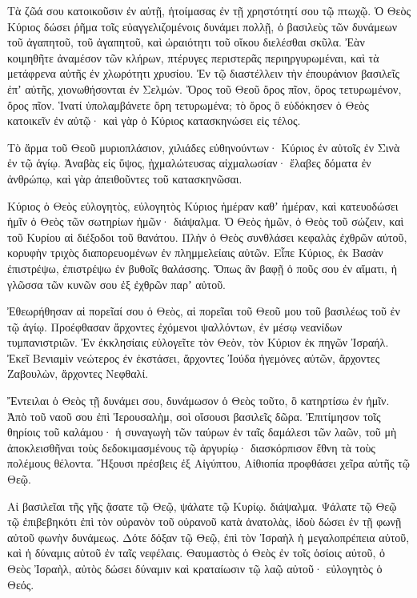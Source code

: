 \begin{spacing}{1.1}
\begin{multicols}{2}
Τὰ ζῶά σου κατοικοῦσιν ἐν αὐτῇ, ἡτοίμασας ἐν τῇ χρηστότητί σου τῷ πτωχῷ.
Ὁ Θεὸς Κύριος δώσει ῥῆμα τοῖς εὐαγγελιζομένοις δυνάμει πολλῇ,
ὁ βασιλεὺς τῶν δυνάμεων τοῦ ἀγαπητοῦ, τοῦ ἀγαπητοῦ, καὶ ὡραιότητι τοῦ οἴκου διελέσθαι σκῦλα.
Ἐὰν κοιμηθῆτε ἀναμέσον τῶν κλήρων, πτέρυγες περιστερᾶς περιηργυρωμέναι, καὶ τὰ μετάφρενα αὐτῆς ἐν χλωρότητι χρυσίου.
Ἐν τῷ διαστέλλειν τὴν ἐπουράνιον βασιλεῖς ἐπʼ αὐτῆς, χιονωθήσονται ἐν Σελμών.
Ὄρος τοῦ Θεοῦ ὄρος πῖον, ὄρος τετυρωμένον, ὄρος πῖον.
Ἱνατί ὑπολαμβάνετε ὄρη τετυρωμένα; τὸ ὄρος ὃ εὐδόκησεν ὁ Θεὸς κατοικεῖν ἐν αὐτῷ· καὶ γὰρ ὁ Κύριος κατασκηνώσει εἰς τέλος.

Τὸ ἅρμα τοῦ Θεοῦ μυριοπλάσιον, χιλιάδες εὐθηνούντων· Κύριος ἐν αὐτοῖς ἐν Σινὰ ἐν τῷ ἁγίῳ.
Ἀναβὰς εἰς ὕψος, ᾐχμαλώτευσας αἰχμαλωσίαν· ἔλαβες δόματα ἐν ἀνθρώπῳ, καὶ γὰρ ἀπειθοῦντες τοῦ κατασκηνῶσαι.

Κύριος ὁ Θεὸς εὐλογητὸς, εὐλογητὸς Κύριος ἡμέραν καθʼ ἡμέραν, καὶ κατευοδώσει ἡμῖν ὁ Θεὸς τῶν σωτηρίων ἡμῶν· διάψαλμα.
Ὁ Θεὸς ἡμῶν, ὁ Θεὸς τοῦ σώζειν, καὶ τοῦ Κυρίου αἱ διέξοδοι τοῦ θανάτου.
Πλὴν ὁ Θεὸς συνθλάσει κεφαλὰς ἐχθρῶν αὐτοῦ, κορυφὴν τριχὸς διαπορευομένων ἐν πλημμελείαις αὐτῶν.
Εἶπε Κύριος, ἐκ Βασὰν ἐπιστρέψω, ἐπιστρέψω ἐν βυθοῖς θαλάσσης.
Ὅπως ἂν βαφῇ ὁ ποῦς σου ἐν αἵματι, ἡ γλῶσσα τῶν κυνῶν σου ἐξ ἐχθρῶν παρʼ αὐτοῦ.

Ἐθεωρήθησαν αἱ πορεῖαί σου ὁ Θεὸς, αἱ πορεῖαι τοῦ Θεοῦ μου τοῦ βασιλέως τοῦ ἐν τῷ ἁγίῳ.
Προέφθασαν ἄρχοντες ἐχόμενοι ψαλλόντων, ἐν μέσῳ νεανίδων τυμπανιστριῶν.
Ἐν ἐκκλησίαις εὐλογεῖτε τὸν Θεὸν, τὸν Κύριον ἐκ πηγῶν Ἰσραήλ.
Ἐκεῖ Βενιαμὶν νεώτερος ἐν ἐκστάσει, ἄρχοντες Ἰούδα ἡγεμόνες αὐτῶν, ἄρχοντες Ζαβουλὼν, ἄρχοντες Νεφθαλί.

Ἔντειλαι ὁ Θεὸς τῇ δυνάμει σου, δυνάμωσον ὁ Θεὸς τοῦτο, ὃ κατηρτίσω ἐν ἡμῖν.
Ἀπὸ τοῦ ναοῦ σου ἐπὶ Ἱερουσαλὴμ, σοὶ οἴσουσι βασιλεῖς δῶρα.
Ἐπιτίμησον τοῖς θηρίοις τοῦ καλάμου· ἡ συναγωγὴ τῶν ταύρων ἐν ταῖς δαμάλεσι τῶν λαῶν, τοῦ μὴ ἀποκλεισθῆναι τοὺς δεδοκιμασμένους τῷ ἀργυρίῳ· διασκόρπισον ἔθνη τὰ τοὺς πολέμους θέλοντα.
Ἥξουσι πρέσβεις ἐξ Αἰγύπτου, Αἰθιοπία προφθάσει χεῖρα αὐτῆς τῷ Θεῷ.

Αἱ βασιλεῖαι τῆς γῆς ᾄσατε τῷ Θεῷ, ψάλατε τῷ Κυρίῳ. διάψαλμα.
Ψάλατε τῷ Θεῷ τῷ ἐπιβεβηκότι ἐπὶ τὸν οὐρανὸν τοῦ οὐρανοῦ κατὰ ἀνατολὰς, ἰδοὺ δώσει ἐν τῇ φωνῇ αὐτοῦ φωνὴν δυνάμεως.
Δότε δόξαν τῷ Θεῷ, ἐπὶ τὸν Ἰσραὴλ ἡ μεγαλοπρέπεια αὐτοῦ, καὶ ἡ δύναμις αὐτοῦ ἐν ταῖς νεφέλαις.
Θαυμαστὸς ὁ Θεὸς ἐν τοῖς ὁσίοις αὐτοῦ, ὁ Θεὸς Ἰσραὴλ, αὐτὸς δώσει δύναμιν καὶ κραταίωσιν τῷ λαῷ αὐτοῦ· εὐλογητὸς ὁ Θεός.


\end{multicols}
\end{spacing}
